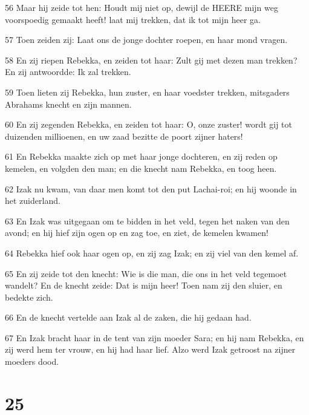 \par 56 Maar hij zeide tot hen: Houdt mij niet op, dewijl de HEERE mijn weg voorspoedig gemaakt heeft! laat mij trekken, dat ik tot mijn heer ga.
\par 57 Toen zeiden zij: Laat ons de jonge dochter roepen, en haar mond vragen.
\par 58 En zij riepen Rebekka, en zeiden tot haar: Zult gij met dezen man trekken? En zij antwoordde: Ik zal trekken.
\par 59 Toen lieten zij Rebekka, hun zuster, en haar voedster trekken, mitsgaders Abrahams knecht en zijn mannen.
\par 60 En zij zegenden Rebekka, en zeiden tot haar: O, onze zuster! wordt gij tot duizenden millioenen, en uw zaad bezitte de poort zijner haters!
\par 61 En Rebekka maakte zich op met haar jonge dochteren, en zij reden op kemelen, en volgden den man; en die knecht nam Rebekka, en toog heen.
\par 62 Izak nu kwam, van daar men komt tot den put Lachai-roi; en hij woonde in het zuiderland.
\par 63 En Izak was uitgegaan om te bidden in het veld, tegen het naken van den avond; en hij hief zijn ogen op en zag toe, en ziet, de kemelen kwamen!
\par 64 Rebekka hief ook haar ogen op, en zij zag Izak; en zij viel van den kemel af.
\par 65 En zij zeide tot den knecht: Wie is die man, die ons in het veld tegemoet wandelt? En de knecht zeide: Dat is mijn heer! Toen nam zij den sluier, en bedekte zich.
\par 66 En de knecht vertelde aan Izak al de zaken, die hij gedaan had.
\par 67 En Izak bracht haar in de tent van zijn moeder Sara; en hij nam Rebekka, en zij werd hem ter vrouw, en hij had haar lief. Alzo werd Izak getroost na zijner moeders dood.

\chapter{25}

